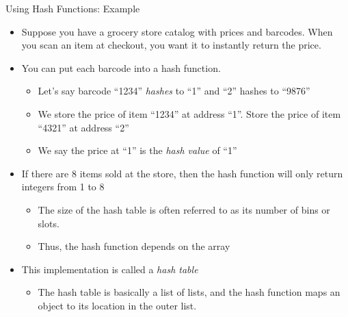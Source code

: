 \documentclass[
  ignorenonframetext,
]{beamer}
\providecommand{\tightlist}{%
  \setlength{\itemsep}{0pt}\setlength{\parskip}{0pt}}\usepackage{longtable,booktabs,array}
\begin{document}
\begin{frame}{Using Hash Functions: Example}
\protect\hypertarget{using-hash-functions-example}{}
\begin{itemize}
\item
  Suppose you have a grocery store catalog with prices and barcodes.
  When you scan an item at checkout, you want it to instantly return the
  price.
\item
  You can put each barcode into a hash function.

  \begin{itemize}
  \item
    Let's say barcode ``1234'' \emph{hashes} to ``1'' and ``2'' hashes
    to ``9876''
  \item
    We store the price of item ``1234'' at address ``1''. Store the
    price of item ``4321'' at address ``2''
  \item
    We say the price at ``1'' is the \emph{hash value} of ``1''
  \end{itemize}
\item
  If there are 8 items sold at the store, then the hash function will
  only return integers from 1 to 8

  \begin{itemize}
  \item
    The size of the hash table is often referred to as its number of
    bins or slots.
  \item
    Thus, the hash function depends on the array
  \end{itemize}
\item
  This implementation is called a \emph{hash table}

  \begin{itemize}
  \tightlist
  \item
    The hash table is basically a list of lists, and the hash function
    maps an object to its location in the outer list.
  \end{itemize}
\end{itemize}
\end{frame}
\end{document}
